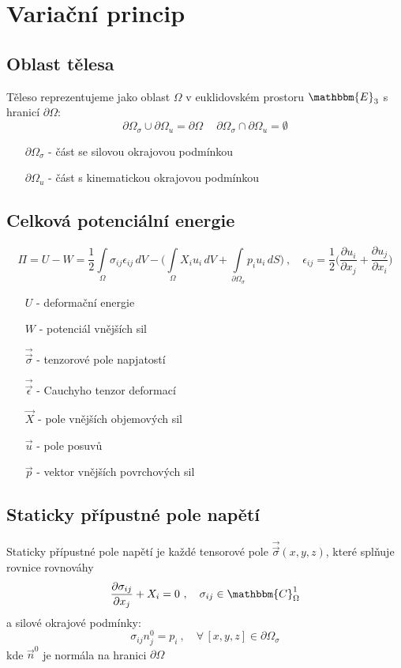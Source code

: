 \documentclass[10pt,oneside]{article}
\newcommand{\tenz}[1]{\vec{\vec{#1}}}
\begin{document}
\section*{Variační princip}
\subsection*{Oblast tělesa}

Těleso reprezentujeme jako oblast $\Omega$ v euklidovském prostoru $\mathbbm{E}_3$ s hranicí $\partial\Omega$:
%
\begin{equation*}
	\partial\Omega_\sigma \cup \partial\Omega_u = \partial\Omega \ \quad \partial\Omega_\sigma \cap \partial\Omega_u = \emptyset
\end{equation*}
%
\begin{itemize}
	\item[$\partial\Omega_\sigma$] - část se silovou okrajovou podmínkou
	\item[$\partial\Omega_u$] - část s kinematickou okrajovou podmínkou
\end{itemize}

\subsection*{Celková potenciální energie}
%
\begin{equation*}
	\Pi = U - W = \frac{1}{2}\int\limits_\Omega \sigma_{ij} \epsilon_{ij} \,dV - \Bigg( \int\limits_\Omega X_i u_i \,dV + \int\limits_{\partial\Omega_\sigma} p_i u_i \,dS \Bigg)
	\ ,\quad
	\epsilon_{ij} = \frac{1}{2} \bigg(\frac{\partial u_i}{\partial x_j} + \frac{\partial u_j}{\partial x_i} \bigg)
\end{equation*}
%
\begin{itemize}
	\item[$U$] - deformační energie
	\item[$W$] - potenciál vnějších sil
	\item[$\tenz{\sigma}$] - tenzorové pole napjatostí
	\item[$\tenz{\epsilon}$] - Cauchyho tenzor deformací
	\item[$\vec{X}$] - pole vnějších objemových sil
	\item[$\vec{u}$] - pole posuvů
	\item[$\vec{p}$] - vektor vnějších povrchových sil
\end{itemize}

\subsection*{Staticky přípustné pole napětí}
%
Staticky přípustné pole napětí je každé tensorové pole $\tenz{\sigma}(x,y,z)$, které splňuje rovnice rovnováhy
%
\begin{equation*}
	\frac{\partial \sigma_{ij}}{\partial x_j} + X_i = 0 \ ,\quad \sigma_{ij} \in \mathbbm{C}^1_\Omega
\end{equation*}
%
a silové okrajové podmínky:
%
\begin{equation*}
	\sigma_{ij} n^0_j = p_i \ ,\quad \forall\,[x,y,z] \in \partial\Omega_\sigma
\end{equation*}
%
kde $\vec{n}^0$ je normála na hranici $\partial\Omega$
\end{document}

